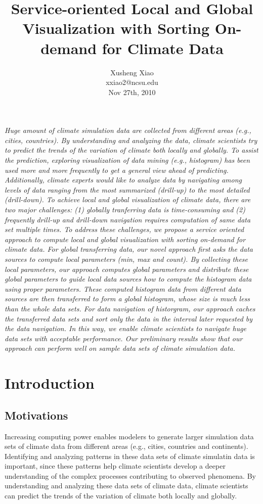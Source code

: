 \documentclass[times, 10pt,onecolumn]{article} %
\title{Service-oriented Local and Global Visualization with Sorting On-demand for Climate Data}
\author{
Xusheng Xiao\\
\small{xxiao2@ncsu.edu}\\
\small{Nov 27th, 2010}
}
\begin{document}
\maketitle
\abstract
\textit{Huge amount of climate simulation data are collected from different areas (e.g., cities, countries). By understanding and analyzing the data, climate scientists try to predict the trends of the variation of climate both locally and globally. To assist the prediction, exploring visualization of data mining (e.g., histogram) has been used more and more frequently to get a general view ahead of predicting. Additionally, climate experts would like to analyze data by navigating among levels of data ranging from the most summarized (drill-up) to the most detailed (drill-down). To achieve local and global visualization of climate data, there are two major challenges: (1) globally tranferring data is time-consuming and (2) frequently drill-up and drill-down navigation requires computation of same data set multiple times. To address these challenges, we propose a service oriented approach to compute local and global visualization with sorting on-demand for climate data. For global transferring data, our novel approach first asks the data sources to compute local parameters (min, max and count). By collecting these local parameters, our approach computes global parameters and distribute these global parameters to guide local data sources how to compute the histogram data using proper parameters. These computed histogram data from different data sources are then transferred to form a global histogram, whose size is much less than the whole data sets. For data navigation of historgram, our approach caches the transferred data sets and sort only the data in the interval later requested by the data navigation. In this way, we enable climate scientists to navigate huge data sets with acceptable performance. Our preliminary results show that our approach can perform well on sample data sets of climate simulation data.  
}\endabstract

\section{Introduction}
\subsection{Motivations} 
Increasing computing power enables modelers to generate larger simulation data sets of climate data from different areas (e.g., cities, countries and continents). Identifying and analyzing patterns in these data sets of climate simulatin data is important, since these patterns help climate scientists develop a deeper understanding of the complex processes contributing to observed phenomena. By understanding and analyzing these data sets of climate data, climate scientists can predict the trends of the variation of climate both locally and globally. 
\end{document}
